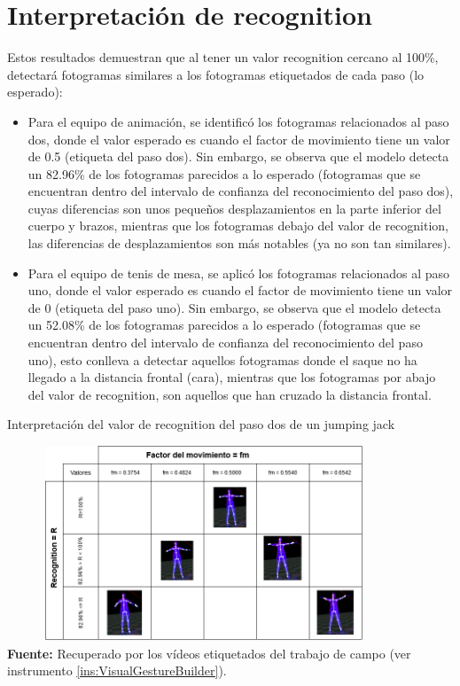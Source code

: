\section{Interpretaci\'on de recognition} \label{res:recognition}
Estos resultados demuestran que al tener un valor recognition cercano al 100\%, detectar\'a fotogramas similares a los fotogramas etiquetados de cada paso (lo esperado):
\begin{itemize}
\item  Para el equipo de animaci\'on, se identific\'o los fotogramas relacionados al paso dos, donde el valor esperado es cuando el factor de movimiento tiene un valor de 0.5 (etiqueta del paso dos). Sin embargo, se observa que el modelo detecta un 82.96\% de los fotogramas parecidos a lo esperado (fotogramas que se encuentran dentro del intervalo de confianza del reconocimiento del paso dos), cuyas diferencias son unos peque\~nos desplazamientos en la parte inferior del cuerpo y brazos, mientras que los fotogramas debajo del valor de recognition, las diferencias de desplazamientos son m\'as notables (ya no son tan similares).
\item  Para el equipo de tenis de mesa, se aplic\'o  los fotogramas relacionados al paso uno, donde el valor esperado es cuando el factor de movimiento tiene un valor de 0 (etiqueta del paso uno). Sin embargo, se observa que el modelo detecta un 52.08\% de los fotogramas parecidos a lo esperado (fotogramas que se encuentran dentro del intervalo de confianza del reconocimiento del paso uno), esto conlleva a detectar aquellos fotogramas donde el saque no ha llegado a la distancia frontal (cara), mientras que los fotogramas por abajo del valor de recognition, son aquellos que han cruzado la distancia frontal.
\end{itemize}
\begin{table}[H]
	\caption{Interpretaci\'on del valor de recognition del paso dos de un jumping jack}
	\label{fig:recognitionJumpingJack}
	\centering
	\includegraphics[width=445px,height=220px]{graphics/resultados/recognitionChe.PNG} \\
	\textbf{Fuente:} Recuperado por los v\'ideos etiquetados del trabajo de campo (ver instrumento \ref{ins:VisualGestureBuilder}).
\end{table}
